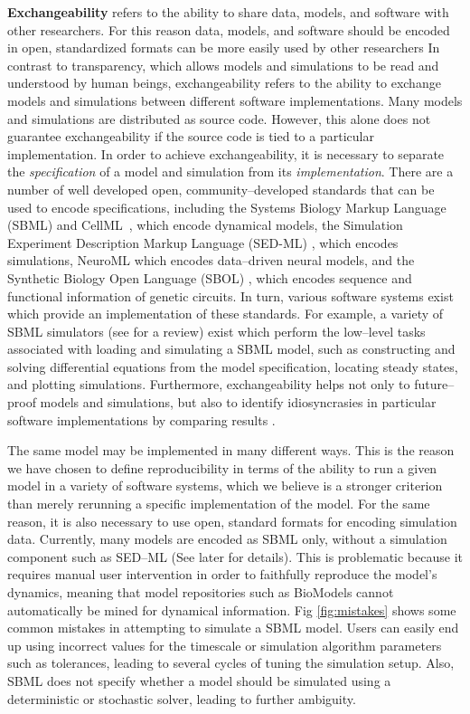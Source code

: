 \documentclass[10pt,letterpaper]{article}
\begin{document}
\textbf{Exchangeability} refers to the ability to share data, models, and software with other researchers. For this reason data, models, and software should be encoded in open, standardized formats can be more easily used by other researchers  In contrast to transparency, which allows models and simulations to be read and understood by human beings, exchangeability refers to the ability to exchange models and simulations between different software implementations. Many models and simulations are distributed as source code. However, this alone does not guarantee exchangeability if the source code is tied to a particular implementation. In order to achieve exchangeability, it is necessary to separate the \textit{specification} of a model and simulation from its \textit{implementation}. There are a number of well developed open, community--developed standards that can be used to encode specifications, including the Systems Biology Markup Language (SBML) \cite{hucka2003systems,bornstein2008libsbml} and CellML~\cite{cuellar2003overview}, which encode dynamical models, the Simulation Experiment Description Markup Language (SED-ML) \cite{waltemath2011reproducible}, which encodes simulations, NeuroML \cite{gleeson2010neuroml} which encodes data--driven neural models, and the Synthetic Biology Open Language (SBOL) \cite{bartley2015synthetic,galdzicki2014synthetic}, which encodes sequence and functional information of genetic circuits. In turn, various software systems exist which provide an implementation of these standards. For example, a variety of SBML simulators (see \cite{sauro2008standards} %
for a review) exist which perform the low--level tasks associated with loading and simulating a SBML model, such as constructing and solving differential equations from the model specification, locating steady states, and plotting simulations. Furthermore, exchangeability helps not only to future--proof models and simulations, but also to identify idiosyncrasies in particular software implementations by comparing results \cite{bergmann2008comparing}.

The same model may be implemented in many different ways. This is the reason we have chosen to define reproducibility in terms of the ability to run a given model in a variety of software systems, which we believe is a stronger criterion than merely rerunning a specific implementation of the model. For the same reason, it is also necessary to use open, standard formats for encoding simulation data. Currently, many models are encoded as SBML only, without a simulation component such as SED--ML (See later for details). This is problematic because it requires manual user intervention in order to faithfully reproduce the model's dynamics, meaning that model repositories such as BioModels \cite{le2006biomodels} cannot automatically be mined for dynamical information. Fig \ref{fig:mistakes} shows some common mistakes in attempting to simulate a SBML model. Users can easily end up using incorrect values for the timescale or simulation algorithm parameters such as tolerances, leading to several cycles of tuning the simulation setup. Also, SBML does not specify whether a model should be simulated using a deterministic or stochastic solver, leading to further ambiguity.
\end{document}
